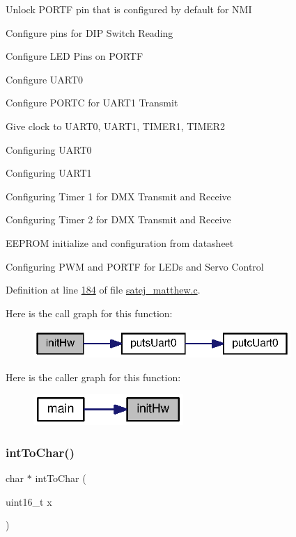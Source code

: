 Unlock P\+O\+R\+TF pin that is configured by default for N\+MI

Configure pins for D\+IP Switch Reading

Configure L\+ED Pins on P\+O\+R\+TF

Configure U\+A\+R\+T0

Configure P\+O\+R\+TC for U\+A\+R\+T1 Transmit

Give clock to U\+A\+R\+T0, U\+A\+R\+T1, T\+I\+M\+E\+R1, T\+I\+M\+E\+R2

Configuring U\+A\+R\+T0

Configuring U\+A\+R\+T1

Configuring Timer 1 for D\+MX Transmit and Receive

Configuring Timer 2 for D\+MX Transmit and Receive

E\+E\+P\+R\+OM initialize and configuration from datasheet

Configuring P\+WM and P\+O\+R\+TF for L\+E\+Ds and Servo Control

Definition at line \mbox{\hyperlink{satej__matthew_8c_source_l00184}{184}} of file \mbox{\hyperlink{satej__matthew_8c_source}{satej\+\_\+matthew.\+c}}.

Here is the call graph for this function\+:
\nopagebreak
\begin{figure}[H]
\begin{center}
\leavevmode
\includegraphics[width=277pt]{satej__matthew_8c_ae5e20c90f0611c1fd09fad99cc3a30a6_cgraph}
\end{center}
\end{figure}
Here is the caller graph for this function\+:
\nopagebreak
\begin{figure}[H]
\begin{center}
\leavevmode
\includegraphics[width=161pt]{satej__matthew_8c_ae5e20c90f0611c1fd09fad99cc3a30a6_icgraph}
\end{center}
\end{figure}
\mbox{\label{satej__matthew_8c_a48ff33038777eac27bf41ff14b9368bf}} 
\subsubsection{\texorpdfstring{intToChar()}{intToChar()}}
{\footnotesize\ttfamily char $\ast$ int\+To\+Char (\begin{DoxyParamCaption}\item[{uint16\+\_\+t}]{x }\end{DoxyParamCaption})}



